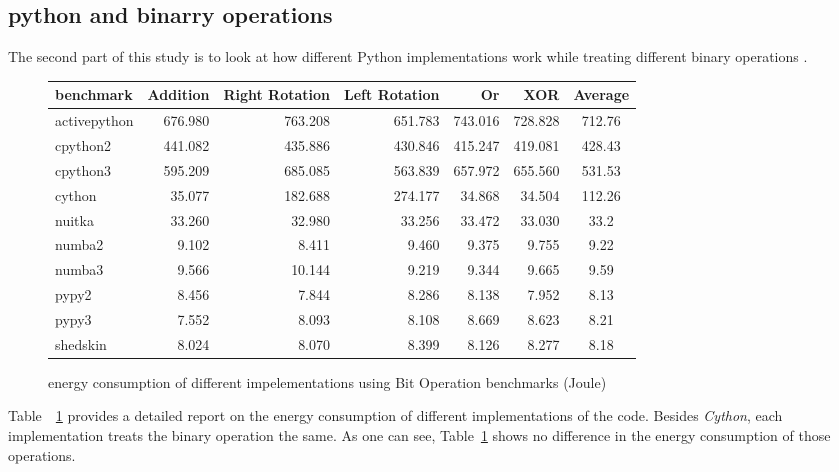 

\subsection{python and binarry operations }
The second part of this study is to look at how different Python implementations work while treating different binary operations .


\begin{figure}[!hbt]
    \begin{tabular}{|lrrrrr|c|}
        \toprule
        benchmark    & Addition & Right Rotation & Left Rotation & Or      & XOR     & Average \\
        \midrule
        activepython & 676.980  & 763.208        & 651.783       & 743.016 & 728.828 & 712.76  \\
        cpython2     & 441.082  & 435.886        & 430.846       & 415.247 & 419.081 & 428.43  \\
        cpython3     & 595.209  & 685.085        & 563.839       & 657.972 & 655.560 & 531.53  \\
        \hline
        cython       & 35.077   & 182.688        & 274.177       & 34.868  & 34.504  & 112.26  \\
        nuitka       & 33.260   & 32.980         & 33.256        & 33.472  & 33.030  & 33.2    \\
        \hline
        numba2       & 9.102    & 8.411          & 9.460         & 9.375   & 9.755   & 9.22    \\
        numba3       & 9.566    & 10.144         & 9.219         & 9.344   & 9.665   & 9.59    \\
        pypy2        & 8.456    & 7.844          & 8.286         & 8.138   & 7.952   & 8.13    \\
        pypy3        & 7.552    & 8.093          & 8.108         & 8.669   & 8.623   & 8.21    \\
        shedskin     & 8.024    & 8.070          & 8.399         & 8.126   & 8.277   & 8.18    \\
        \bottomrule
    \end{tabular}
    \caption{energy consumption of different impelementations using Bit Operation benchmarks (Joule) }
    \label{table:bitops}
\end{figure}


Table~~\ref{table:bitops} provides a detailed report on the energy consumption of different implementations of the code.
Besides \emph{Cython}, each implementation treats the binary operation the same. As one can see, Table~\ref{table:bitops} shows no difference in the energy consumption of those operations.

